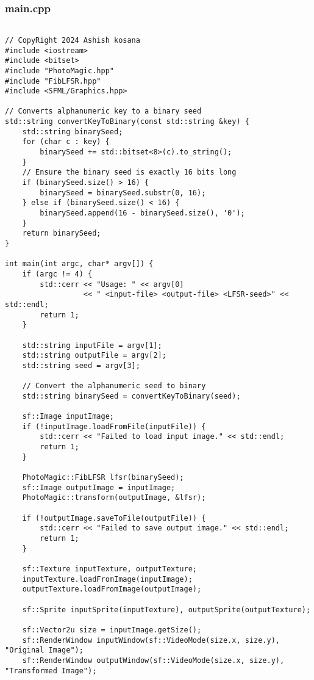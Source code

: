 \documentclass[12pt]{article}
\begin{document}
\subsubsection{main.cpp}
\begin{lstlisting}[style=cppcode]

// CopyRight 2024 Ashish kosana
#include <iostream>
#include <bitset>
#include "PhotoMagic.hpp"
#include "FibLFSR.hpp"
#include <SFML/Graphics.hpp>

// Converts alphanumeric key to a binary seed
std::string convertKeyToBinary(const std::string &key) {
    std::string binarySeed;
    for (char c : key) {
        binarySeed += std::bitset<8>(c).to_string();
    }
    // Ensure the binary seed is exactly 16 bits long
    if (binarySeed.size() > 16) {
        binarySeed = binarySeed.substr(0, 16);
    } else if (binarySeed.size() < 16) {
        binarySeed.append(16 - binarySeed.size(), '0');
    }
    return binarySeed;
}

int main(int argc, char* argv[]) {
    if (argc != 4) {
        std::cerr << "Usage: " << argv[0]
                  << " <input-file> <output-file> <LFSR-seed>" << std::endl;
        return 1;
    }

    std::string inputFile = argv[1];
    std::string outputFile = argv[2];
    std::string seed = argv[3];

    // Convert the alphanumeric seed to binary
    std::string binarySeed = convertKeyToBinary(seed);

    sf::Image inputImage;
    if (!inputImage.loadFromFile(inputFile)) {
        std::cerr << "Failed to load input image." << std::endl;
        return 1;
    }

    PhotoMagic::FibLFSR lfsr(binarySeed);
    sf::Image outputImage = inputImage;
    PhotoMagic::transform(outputImage, &lfsr);

    if (!outputImage.saveToFile(outputFile)) {
        std::cerr << "Failed to save output image." << std::endl;
        return 1;
    }

    sf::Texture inputTexture, outputTexture;
    inputTexture.loadFromImage(inputImage);
    outputTexture.loadFromImage(outputImage);

    sf::Sprite inputSprite(inputTexture), outputSprite(outputTexture);

    sf::Vector2u size = inputImage.getSize();
    sf::RenderWindow inputWindow(sf::VideoMode(size.x, size.y), "Original Image");
    sf::RenderWindow outputWindow(sf::VideoMode(size.x, size.y), "Transformed Image");


\end{lstlisting}
\end{document}
